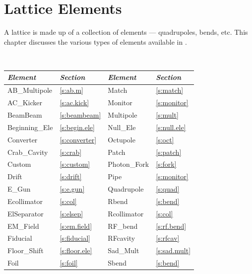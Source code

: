 \chapter{Lattice Elements}
\label{c:elements}

A lattice is made up of a collection of elements --- quadrupoles,
bends, etc. This chapter discusses the various types of elements
available in \bmad.

\begin{table}[htb]
\centering
{\tt
\begin{tabular}{llll} \toprule
  {\it Element}     & {\it Section}         & {\it Element}      & {\it Section}      \\ \midrule
  AB_Multipole      & \ref{s:ab.m}          &  Match             & \ref{s:match}      \\
  AC_Kicker         & \ref{s:ac.kick}       &  Monitor           & \ref{s:monitor}    \\
  BeamBeam          & \ref{s:beambeam}      &  Multipole         & \ref{s:mult}       \\
  Beginning_Ele     & \ref{s:begin.ele}     &  Null_Ele          & \ref{s:null.ele}   \\
  Converter         & \ref{s:converter}     &  Octupole          & \ref{s:oct}        \\
  Crab_Cavity       & \ref{s:crab}          &  Patch             & \ref{s:patch}      \\
  Custom            & \ref{s:custom}        &  Photon_Fork       & \ref{s:fork}       \\
  Drift             & \ref{s:drift}         &  Pipe              & \ref{s:monitor}    \\
  E_Gun             & \ref{s:e.gun}         &  Quadrupole        & \ref{s:quad}       \\
  Ecollimator       & \ref{s:col}           &  Rbend             & \ref{s:bend}       \\
  ElSeparator       & \ref{s:elsep}         &  Rcollimator       & \ref{s:col}        \\
  EM_Field          & \ref{s:em.field}      &  RF_bend           & \ref{s:rf.bend}    \\
  Fiducial          & \ref{s:fiducial}      &  RFcavity          & \ref{s:rfcav}      \\
  Floor_Shift       & \ref{s:floor.ele}     &  Sad_Mult          & \ref{s:sad.mult}   \\
  Foil              & \ref{s:foil}          &  Sbend             & \ref{s:bend}       \\

\end{tabular}}
\end{table}
